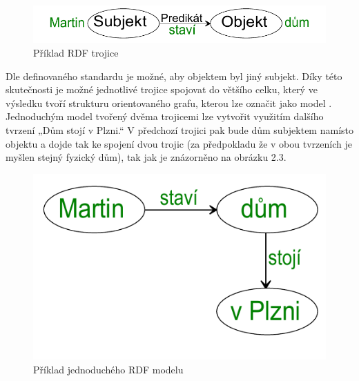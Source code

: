 \documentclass{projekt}
\begin{document}
\begin{figure}[htb]
\begin{center}
\includegraphics[scale=0.9]{trojice.pdf}
\caption{Příklad RDF trojice}
\end{center}
\end{figure}

Dle definovaného standardu \cite{_5} je možné, aby objektem byl jiný subjekt. Díky této skutečnosti je možné jednotlivé trojice spojovat do většího celku, který ve výsledku tvoří strukturu orientovaného grafu, kterou lze označit jako model \cite{_3}. Jednoduchým model tvořený dvěma trojicemi lze vytvořit využitím dalšího tvrzení „Dům stojí v Plzni.“ V předchozí trojici pak bude dům subjektem namísto objektu a dojde tak ke spojení dvou trojic (za předpokladu že v obou tvrzeních je myšlen stejný fyzický dům), tak jak je znázorněno na obrázku 2.3. 

\begin{figure}[htb]
\begin{center}
\includegraphics[scale=0.9]{miniStrom.pdf}
\caption{Příklad jednoduchého RDF modelu}
\end{center}
\end{figure}
\end{document}

